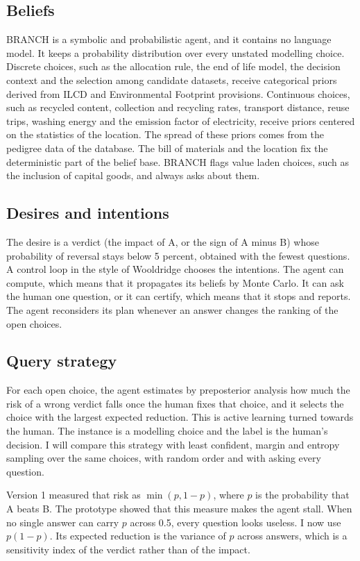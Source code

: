\documentclass{article}
\begin{document}
\subsection{Beliefs}
BRANCH is a symbolic and probabilistic agent, and it contains no language model. It keeps a probability
distribution over every unstated modelling choice. Discrete choices, such as the allocation rule, the end
of life model, the decision context and the selection among candidate datasets, receive categorical
priors derived from ILCD and Environmental Footprint provisions. Continuous choices, such as recycled
content, collection and recycling rates, transport distance, reuse trips, washing energy and the
emission factor of electricity, receive priors centered on the statistics of the location. The spread of
these priors comes from the pedigree data of the database. The bill of materials and the location fix the
deterministic part of the belief base. BRANCH flags value laden choices, such as the inclusion of capital
goods, and always asks about them.

\subsection{Desires and intentions}
The desire is a verdict (the impact of A, or the sign of A minus B) whose probability of reversal stays
below 5 percent, obtained with the fewest questions.
A control loop in the style of Wooldridge chooses the intentions. The agent can compute, which means that
it propagates its beliefs by Monte Carlo. It can ask the human one question, or it can certify, which
means that it stops and reports. The agent reconsiders its plan whenever an answer changes the ranking of
the open choices.

\subsection{Query strategy}
For each open choice, the agent estimates by preposterior analysis how much the risk of a wrong verdict
falls once the human fixes that choice, and it selects the choice with the largest expected reduction.
This is active learning turned towards the human. The instance is a modelling choice and the label is the
human's decision. I will compare this strategy with least confident, margin and entropy sampling over the
same choices, with random order and with asking every question.

Version 1 measured that risk as $\min(p,1-p)$, where $p$ is the probability that A beats B. The prototype
showed that this measure makes the agent stall. When no single answer can carry $p$ across 0.5, every
question looks useless. I now use $p(1-p)$. Its expected reduction is the variance of $p$ across answers,
which is a sensitivity index of the verdict rather than of the impact.
\end{document}
